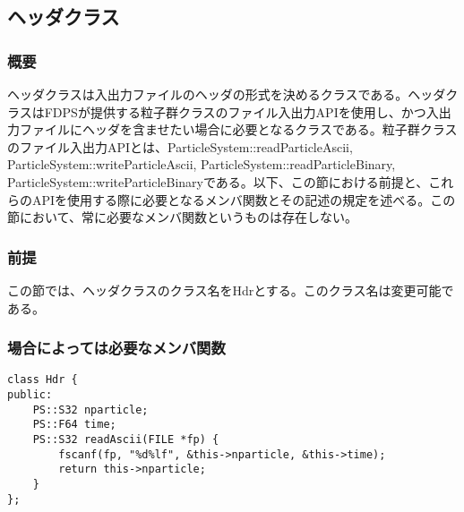\subsection{ヘッダクラス}
\label{sec:example_userdefined_header}

\subsubsection{概要}

ヘッダクラスは入出力ファイルのヘッダの形式を決めるクラスである。ヘッダクラスはFDPSが提供する粒子群クラスのファイル入出力APIを使用し、かつ入出力ファイルにヘッダを含ませたい場合に必要となるクラスである。粒子群クラスのファイル入出力APIとは、ParticleSystem::readParticleAscii, ParticleSystem::writeParticleAscii, ParticleSystem::readParticleBinary, ParticleSystem::writeParticleBinaryである。以下、この節における前提と、これらのAPIを使用する際に必要となるメンバ関数とその記述の規定を述べる。この節において、常に必要なメンバ関数というものは存在しない。

\subsubsection{前提}

この節では、ヘッダクラスのクラス名をHdrとする。このクラス名は変更可能である。

\subsubsection{場合によっては必要なメンバ関数}


\begin{screen}
\begin{verbatim}
class Hdr {
public:
    PS::S32 nparticle;
    PS::F64 time;
    PS::S32 readAscii(FILE *fp) {
        fscanf(fp, "%d%lf", &this->nparticle, &this->time);
        return this->nparticle;
    }
};
\end{verbatim}
\end{screen}

